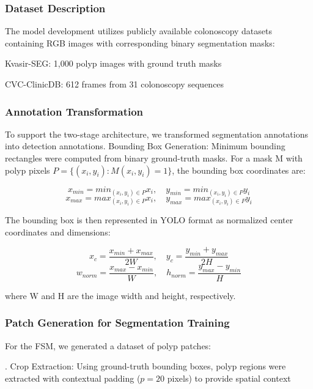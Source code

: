 \documentclass[runningheads]{llncs}
\begin{document}
\subsubsection{Dataset Description}
The model development utilizes publicly available colonoscopy datasets containing RGB images with corresponding binary segmentation masks:

\noindent Kvasir-SEG: 1,000 polyp images with ground truth masks

\noindent CVC-ClinicDB: 612 frames from 31 colonoscopy sequences

\subsubsection{Annotation Transformation}
To support the two-stage architecture, we transformed segmentation annotations into detection annotations. Bounding Box Generation: Minimum bounding rectangles were computed from binary ground-truth masks. For a mask M with polyp pixels $P=\{(x_{i},y_{i}) : M(x_{i},y_{i})=1\}$, the bounding box coordinates are:

\begin{equation}
x_{min}=min_{(x_{i},y_{i})\in P}x_{i}, \quad y_{min}=min_{(x_{i},y_{i})\in P}y_{i}
\end{equation}
\begin{equation}
x_{max}=max_{(x_{i},y_{i})\in P}x_{i}, \quad y_{max}=max_{(x_{i},y_{i})\in P}y_{i}
\end{equation}

The bounding box is then represented in YOLO format as normalized center coordinates and dimensions:

\begin{equation}
x_{c}=\frac{x_{min}+x_{max}}{2W}, \quad y_{c}=\frac{y_{min}+y_{max}}{2H}
\end{equation}
\begin{equation}
w_{norm}=\frac{x_{max}-x_{min}}{W}, \quad h_{norm}=\frac{y_{max}-y_{min}}{H}
\end{equation}

where W and H are the image width and height, respectively.

\subsubsection{Patch Generation for Segmentation Training}
For the FSM, we generated a dataset of polyp patches:

. Crop Extraction: Using ground-truth bounding boxes, polyp regions were extracted with contextual padding ($p=20$ pixels) to provide spatial context
\end{document}
